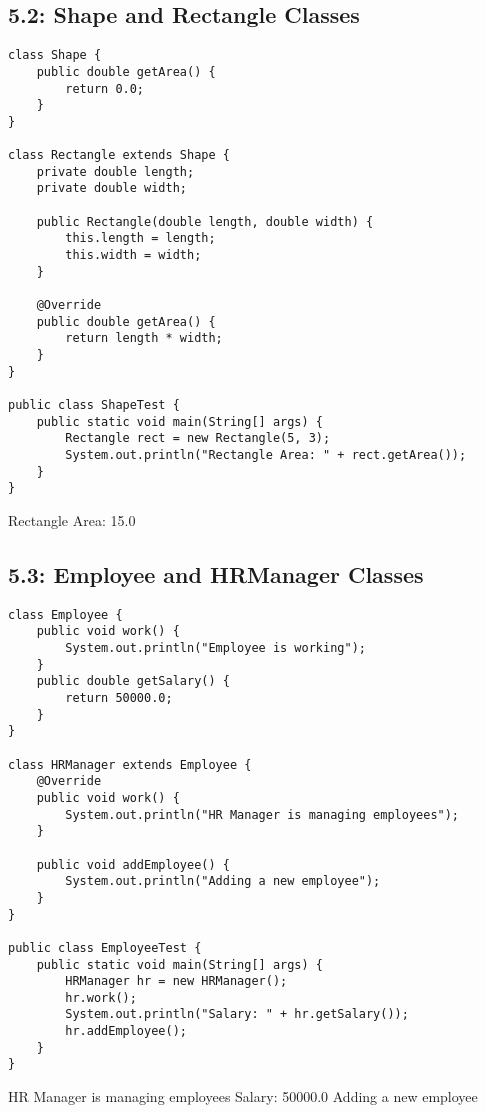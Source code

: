 \documentclass[a4paper,12pt]{article}
\begin{document}
\clearpage
\subsection{5.2: Shape and Rectangle Classes}
\begin{samepage}
\begin{lstlisting}[caption={ShapeTest.java}]
class Shape {
    public double getArea() {
        return 0.0;
    }
}

class Rectangle extends Shape {
    private double length;
    private double width;
    
    public Rectangle(double length, double width) {
        this.length = length;
        this.width = width;
    }
    
    @Override
    public double getArea() {
        return length * width;
    }
}

public class ShapeTest {
    public static void main(String[] args) {
        Rectangle rect = new Rectangle(5, 3);
        System.out.println("Rectangle Area: " + rect.getArea());
    }
}
\end{lstlisting}

\begin{outputlisting}
Rectangle Area: 15.0
\end{outputlisting}
\end{samepage}

\clearpage
\subsection{5.3: Employee and HRManager Classes}
\begin{samepage}
\begin{lstlisting}[caption={EmployeeTest.java}]
class Employee {
    public void work() {
        System.out.println("Employee is working");
    }
    public double getSalary() {
        return 50000.0;
    }
}

class HRManager extends Employee {
    @Override
    public void work() {
        System.out.println("HR Manager is managing employees");
    }
    
    public void addEmployee() {
        System.out.println("Adding a new employee");
    }
}

public class EmployeeTest {
    public static void main(String[] args) {
        HRManager hr = new HRManager();
        hr.work();
        System.out.println("Salary: " + hr.getSalary());
        hr.addEmployee();
    }
}
\end{lstlisting}

\begin{outputlisting}
HR Manager is managing employees
Salary: 50000.0
Adding a new employee
\end{outputlisting}
\end{samepage}
\end{document}

